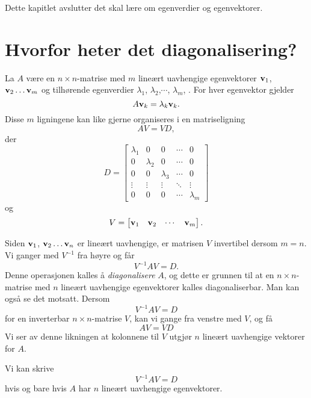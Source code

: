 

\label{ch:diagonalisering}
Dette kapitlet avslutter det skal lære om egenverdier og egenvektorer.


\section*{Hvorfor heter det diagonalisering?}
La $A$ være en  $n \times n$-matrise med $m$ lineært uavhengige egenvektorer
$\mathbf{v}_1$, $\mathbf{v}_2\dots \mathbf{v}_m$ 
og tilhørende egenverdier $\lambda_1$, $\lambda_2$,$\cdots$, $\lambda_m$, . 
For hver egenvektor gjelder
\[
A\mathbf{v}_k=\lambda_k \mathbf{v}_k.
\]
Disse $m$ ligningene kan like gjerne organiseres i en matriseligning
\[
AV=VD, 
\]
der 
\[
D=
\begin{bmatrix}
\lambda_1      & 0      & 0      & \cdots & 0 \\
0      & \lambda_2      & 0      & \cdots & 0 \\
0      & 0      & \lambda_3      & \cdots & 0 \\
\vdots & \vdots & \vdots & \ddots & \vdots \\
0      & 0      & 0      & \cdots & \lambda_m
\end{bmatrix}
\]
og 
\[
V=
\begin{bmatrix}
\mathbf{v}_1 & \mathbf{v}_2 & \cdots & \mathbf{v}_m
\end{bmatrix}.
\]

Siden $\mathbf{v}_1$, $\mathbf{v}_2\dots \mathbf{v}_n$ er lineært uavhengige, er matrisen $V$  invertibel dersom $m=n$.
Vi ganger med $V^{-1}$ fra høyre og får
\[
V^{-1}AV=D.
\]
Denne operasjonen kalles å \emph{diagonalisere} $A$, og dette er grunnen til at en $n\times n$-matrise med $n$ lineært uavhengige egenvektorer kalles diagonaliserbar. 
Man kan også se det motsatt. Dersom 
\[
V^{-1}AV=D
\]
for en inverterbar $n \times n$-matrise $V$, kan vi gange fra venstre med $V$, og få
\[
AV=VD
\]
Vi ser av denne likningen at kolonnene til $V$ utgjør $n$ lineært uavhengige vektorer for $A$.

\begin{thm}
Vi kan skrive 
\[
V^{-1}AV=D
\]
hvis og bare hvis $A$ har $n$ lineært uavhengige egenvektorer.
\end{thm}

